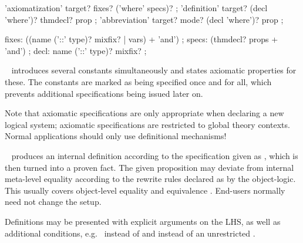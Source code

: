 \begin{isabellebody}
\begin{isamarkuptext}
  \begin{rail}
    'axiomatization' target? fixes? ('where' specs)?
    ;
    'definition' target? (decl 'where')? thmdecl? prop
    ;
    'abbreviation' target? mode? (decl 'where')? prop
    ;

    fixes: ((name ('::' type)? mixfix? | vars) + 'and')
    ;
    specs: (thmdecl? props + 'and')
    ;
    decl: name ('::' type)? mixfix?
    ;
  \end{rail}

  \begin{description}
  
  \item \hyperlink{command.axiomatization}{\mbox{}}~
  introduces several constants simultaneously and states axiomatic
  properties for these.  The constants are marked as being specified
  once and for all, which prevents additional specifications being
  issued later on.
  
  Note that axiomatic specifications are only appropriate when
  declaring a new logical system; axiomatic specifications are
  restricted to global theory contexts.  Normal applications should
  only use definitional mechanisms!

  \item \hyperlink{command.definition}{\mbox{}}~ produces an
  internal definition  according to the specification
  given as , which is then turned into a proven fact.  The
  given proposition may deviate from internal meta-level equality
  according to the rewrite rules declared as \hyperlink{attribute.defn}{\mbox{}} by the
  object-logic.  This usually covers object-level equality  and equivalence .  End-users normally need not
  change the \hyperlink{attribute.defn}{\mbox{}} setup.
  
  Definitions may be presented with explicit arguments on the LHS, as
  well as additional conditions, e.g.\  instead of
   and  instead of an
  unrestricted .
  

\end{description}
\end{isamarkuptext}
\end{isabellebody}
